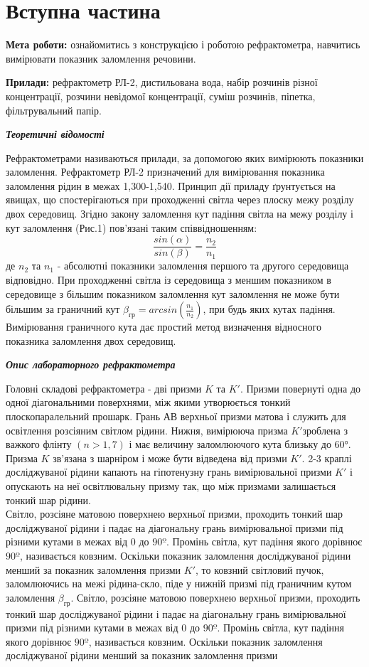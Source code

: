 \section{Вступна частина}
\setlength{\parindent}{4em}
\indent \textbf{Мета роботи:} ознайомитись з конструкцією і роботою рефрактометра, навчитись вимірювати показник заломлення речовини. \par
\textbf{Прилади:} рефрактометр РЛ-2, дистильована вода, набір розчинів різної концентрації, розчини невідомої концентрації, суміш розчинів, піпетка, фільтрувальний папір.
\begin{center}
\textbf{\emph{Теоретичні відомості}}
\end{center}
\indent Рефрактометрами називаються прилади, за допомогою яких вимірюють показники заломлення. Рефрактометр РЛ-2 призначений для вимірювання показника заломлення рідин в межах 1,300-1,540.
Принцип дії приладу ґрунтується на явищах, що спостерігаються при проходженні світла через плоску межу розділу двох середовищ. Згідно закону заломлення кут падіння світла на межу розділу і кут заломлення (Рис.1) пов’язані таким співвідношенням:
$$\frac{sin(\alpha)}{sin(\beta)} = \frac{n_2}{n_1}$$
де $n_2$ та $n_1$ - абсолютні показники заломлення першого та другого середовища відповідно. При проходженні світла із середовища з меншим показником в середовище з більшим показником заломлення кут заломлення не може бути більшим за граничний кут ${\beta}_{гр}= arcsin(\frac{n_1}{n_2})$, при будь яких кутах падіння. Вимірювання граничного кута дає простий метод визначення відносного показника заломлення двох середовищ.
\begin{center}
  {\textbf{\emph{Опис лабораторного рефрактометра}}}
\end{center}
\indent Головні складові рефрактометра - дві призми $K$ та $K'$. Призми повернуті одна до одної діагональними поверхнями, між якими утворюється тонкий плоскопаралельний прошарк. Грань АВ верхньої призми матова і служить для освітлення розсіяним світлом рідини. Нижня, вимірююча призма $K'$зроблена з важкого флінту $(n>1,7)$ і має
величину заломлюючого кута близьку до $60°$. Призма $K$ зв’язана з шарніром і може бути відведена від призми $K'$. 2-3 краплі досліджуваної рідини капають на гіпотенузну грань вимірювальної призми $K'$ і опускають на неї освітлювальну призму так, що між призмами залишається тонкий шар рідини. \\
Світло, розсіяне матовою поверхнею верхньої призми, проходить тонкий шар досліджуваної рідини і падає на діагональну грань вимірювальної призми під різними кутами в межах від 0 до $90º$. Промінь світла, кут падіння якого дорівнює $90º$, називається ковзним. Оскільки показник заломлення досліджуваної рідини менший за показник заломлення призми $K'$, то ковзний світловий пучок, заломлюючись на межі рідина-скло, піде у нижній призмі під граничним кутом заломлення ${\beta}_{гр}$. Світло, розсіяне матовою поверхнею верхньої призми, проходить тонкий шар досліджуваної рідини і падає на діагональну грань вимірювальної призми під різними кутами в межах від 0 до $90º$. Промінь світла, кут падіння якого дорівнює $90º$, називається ковзним. Оскільки показник заломлення досліджуваної рідини менший за показник заломлення призми
